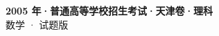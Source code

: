 \documentclass[zihao=-4, a4paper]{ctexart}
\begin{document}
\begin{center}
  {\Large\bfseries 2005 年·普通高等学校招生考试·天津卷·理科}\\[4pt]
  {\large 数学 · 试题版}
\end{center}
\medskip
{}

\end{document}
